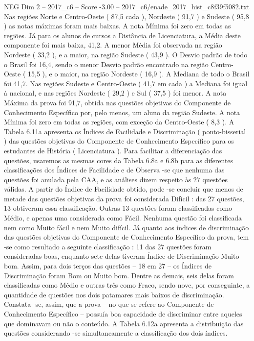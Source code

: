 \begin{textsample}{NEG Dim 2 – 2017\_c6 – Score -3.00 – 2017\_c6/enade\_2017\_hist\_c8f39f5082.txt}
Nas regiões Norte e Centro-Oeste ( 87,5 cada ), Nordeste ( 91,7 ) e Sudeste ( 95,8 ) as notas máximas foram mais baixas.
A nota Mínima foi zero em todas as regiões.
Já para os alunos de cursos a Distância de Licenciatura, a Média deste componente foi mais baixa, 41,2.
A menor Média foi observada na região Nordeste ( 33,2 ), e a maior, na região Sudeste ( 43,9 ).
O Desvio padrão de todo o Brasil foi 16,4, sendo o menor Desvio padrão encontrado na região Centro-Oeste ( 15,5 ), e o maior, na região Nordeste ( 16,9 ).
A Mediana de todo o Brasil foi 41,7.
Nas regiões Sudeste e Centro-Oeste ( 41,7 em cada ) a Mediana foi igual à nacional, e nas regiões Nordeste ( 29,2 ) e Sul ( 37,5 ) foi menor.
A nota Máxima da prova foi 91,7, obtida nas questões objetivas do Componente de Conhecimento Específico por, pelo menos, um aluno da região Sudeste.
A nota Mínima foi zero em todas as regiões, com exceção da Centro-Oeste ( 8,3 ).
A Tabela 6.11a apresenta os Índices de Facilidade e Discriminação ( ponto-bisserial ) das questões objetivas do Componente de Conhecimento Específico para os estudantes de História ( Licenciatura ).
Para facilitar a diferenciação das questões, usaremos as mesmas cores da Tabela 6.8a e 6.8b para as diferentes classificações dos Índices de Facilidade e de Observa -se que nenhuma das questões foi anulada pela CAA, e as análises dizem respeito às 27 questões válidas.
A partir do Índice de Facilidade obtido, pode -se concluir que menos de metade das questões objetivas da prova foi considerada Difícil : das 27 questões, 13 obtiveram essa classificação.
Outras 13 questões foram classificadas como Médio, e apenas uma considerada como Fácil.
Nenhuma questão foi classificada nem como Muito fácil e nem Muito difícil.
Já quanto aos índices de discriminação das questões objetivas do Componente de Conhecimento Específico da prova, tem -se como resultado a seguinte classificação : 11 das 27 questões foram consideradas boas, enquanto sete delas tiveram Índice de Discriminação Muito bom.
Assim, para dois terços das questões – 18 em 27 – os Índices de Discriminação foram Bom ou Muito bom.
Dentre as demais, seis delas foram classificadas como Médio e outras três como Fraco, sendo nove, por conseguinte, a quantidade de questões nos dois patamares mais baixos de discriminação.
Constata -se, assim, que a prova – no que se refere ao Componente de Conhecimento Específico – possuía boa capacidade de discriminar entre aqueles que dominavam ou não o conteúdo.
A Tabela 6.12a apresenta a distribuição das questões considerando -se simultaneamente a classificação dos dois índices.

\end{textsample}
